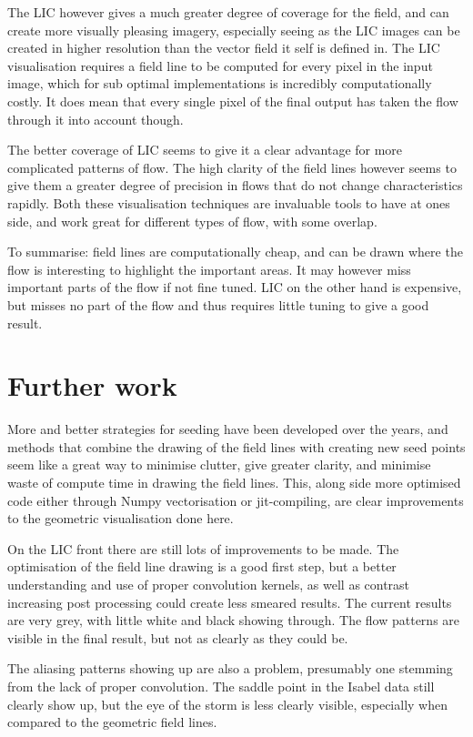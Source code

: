 \documentclass{article}
\begin{document}
The LIC however gives a much greater degree of coverage for the field, and can
create more visually pleasing imagery, especially seeing as the LIC images can be
created in higher resolution than the vector field it self is defined in. The LIC
visualisation requires a field line to be computed for every pixel in the input image, which
for sub optimal implementations is incredibly computationally costly. It does mean that every
single pixel of the final output has taken the flow through it into account though.

The better coverage of LIC seems to give it a clear advantage for more complicated
patterns of flow. The high clarity of the field lines however seems to give them a greater
degree of precision in flows that do not change characteristics rapidly. Both these
visualisation techniques are invaluable tools to have at ones side, and work great
for different types of flow, with some overlap.

To summarise: field lines are computationally cheap, and can be drawn where the flow is interesting
to highlight the important areas. It may however miss important parts of the flow if not fine tuned.
LIC on the other hand is expensive, but misses no part of the flow and thus requires little tuning
to give a good result.


\section{Further work}
More and better strategies for seeding have been developed over the years, and
methods that combine the drawing of the field lines with creating new seed points
seem like a great way to minimise clutter, give greater clarity, and minimise waste
of compute time in drawing the field lines. This, along side more optimised code
either through Numpy vectorisation or jit-compiling, are clear improvements to the
geometric visualisation done here.

On the LIC front there are still lots of improvements to be made. The optimisation
of the field line drawing is a good first step, but a better understanding and use
of proper convolution kernels, as well as contrast increasing post processing
could create less smeared results. The current results are very grey, with little
white and black showing through. The flow patterns are visible in the final result,
but not as clearly as they could be.

The aliasing patterns showing up are also a problem, presumably one stemming from the
lack of proper convolution. The saddle point in the Isabel data still clearly show up,
but the eye of the storm is less clearly visible, especially when compared to the geometric
field lines.
\end{document}
